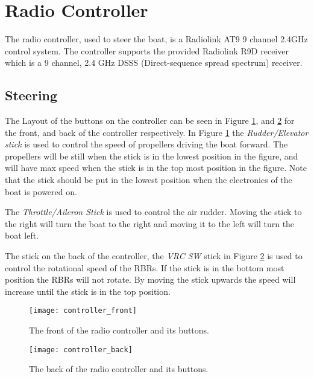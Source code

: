 \section{Radio Controller}
The radio controller, used to steer the boat, is a Radiolink AT9 9 channel 2.4GHz control system. The controller supports the provided Radiolink R9D receiver which is a 9 channel, 2.4 GHz DSSS (Direct-sequence spread spectrum) receiver.
\subsection{Steering}
The Layout of the buttons on the controller can be seen in Figure \ref{fig:controller_front}, and \ref{fig:controller_back} for the front, and back of the controller respectively. In Figure \ref{fig:controller_front} the \textit{Rudder/Elevator stick} is used to control the speed of propellers driving the boat forward. The propellers will be still when the stick is in the lowest position in the figure, and will have max speed when the stick is in the top most position in the figure. Note that the stick should be put in the lowest position when the electronics of the boat is powered on.

The \textit{Throttle/Aileron Stick} is used to control the air rudder. Moving the stick to the right will turn the boat to the right and moving it to the left will turn the boat left.

The stick on the back of the controller, the \textit{VRC SW} stick in Figure \ref{fig:controller_back} is used to control the rotational speed of the RBRs. If the stick is in the bottom most position the RBRs will not rotate. By moving the stick upwards the speed will increase until the stick is in the top position.
\begin{figure}[h]
   \centering
   \texttt{[image: controller\_front]}
   \caption{The front of the radio controller and its buttons.}
   \label{fig:controller_front}
\end{figure}
\begin{figure}[h]
   \centering
   \texttt{[image: controller\_back]}
   \caption{The back of the radio controller and its buttons.}
   \label{fig:controller_back}
\end{figure}

